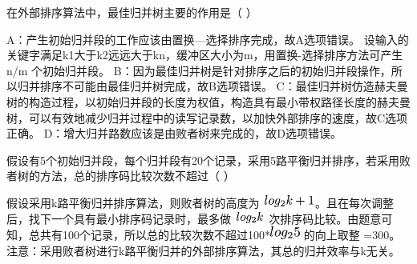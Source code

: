 \question 在外部排序算法中，最佳归并树主要的作用是（ ）
\par{}
\begin{solution}A：产生初始归并段的工作应该由置换---选择排序完成，故A选项错误。
设输入的关键字满足k1大于k2远远大于kn，缓冲区大小为m，用置换-选择排序方法可产生
n/m 个初始归并段。
B：因为最佳归并树是针对排序之后的初始归并段操作，所以归并排序不可能由最佳归并树完成，故B选项错误。
C：最佳归并树仿造赫夫曼树的构造过程，以初始归并段的长度为权值，构造具有最小带权路径长度的赫夫曼树，可以有效地减少归并过程中的读写记录数，以加快外部排序的速度，故C选项正确。
D：增大归并路数应该是由败者树来完成的，故D选项错误。
\end{solution}
\question 假设有5个初始归并段，每个归并段有20个记录，采用5路平衡归并排序，若采用败者树的方法，总的排序码比较次数不超过（
）
\par{}
\begin{solution}假设采用k路平衡归并排序算法，则败者树的高度为
\includegraphics[width=0.67708in,height=0.15625in]{texmath/71308d5Cdpi7B3507Dlog_2k2B1}。且在每次调整后，找下一个具有最小排序码记录时，最多做
\includegraphics[width=0.39583in,height=0.14583in]{texmath/c7c1e85Cdpi7B3507Dlog_2k}
次排序码比较。由题意可知，总共有100个记录，所以总的比较次数不超过100*\includegraphics[width=0.38542in,height=0.16667in]{texmath/36a8485Cdpi7B3507Dlog_25}
的向上取整 =300。
注意：采用败者树进行k路平衡归并的外部排序算法，其总的归并效率与k无关。
\end{solution}
